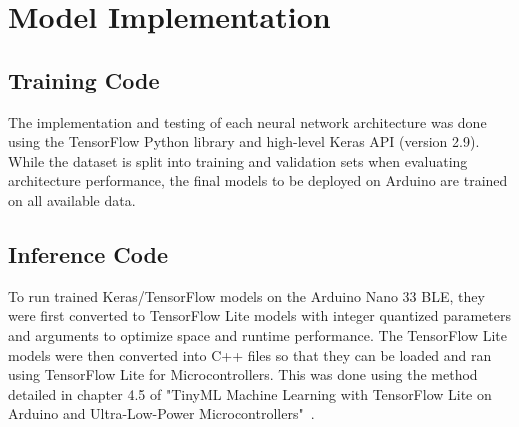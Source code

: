 \section{Model Implementation}\label{sec:model-implementation}
\subsection{Training Code}\label{subsec:training-code}
The implementation and testing of each neural network architecture was done using the TensorFlow Python library and high-level Keras API (version 2.9)\@.
While the dataset is split into training and validation sets when evaluating architecture performance, the final models to be deployed on Arduino are trained on all available data.

\subsection{Inference Code}\label{subsec:inference-code}
To run trained Keras/TensorFlow models on the Arduino Nano 33 BLE, they were first converted to TensorFlow Lite models with integer quantized parameters and arguments to optimize space and runtime performance.
The TensorFlow Lite models were then converted into C++ files so that they can be loaded and ran using TensorFlow Lite for Microcontrollers.
This was done using the method detailed in chapter 4.5 of "TinyML Machine Learning with TensorFlow Lite on Arduino and Ultra-Low-Power Microcontrollers"~\cite{warden2020tinyml}.